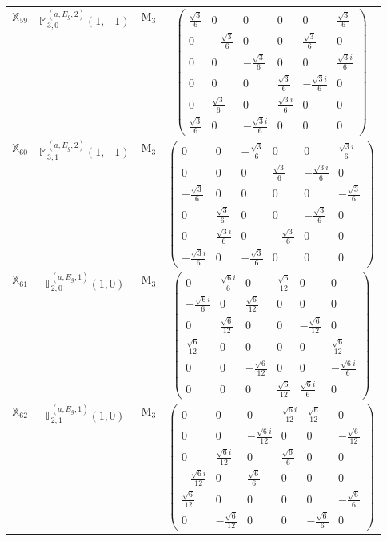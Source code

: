\documentclass[fleqn,10pt,landscape]{article}
\begin{document}
\begin{itemize}
\begin{center}
\begin{longtable}{c|c|c|c}
$ \mathbb{X}_{59} $ & $\mathbb{M}_{3,0}^{(a,E_{g},2)}(1,-1)$ & M$_{3}$ & $\begin{pmatrix} \frac{\sqrt{3}}{6} & 0 & 0 & 0 & 0 & \frac{\sqrt{3}}{6} \\ 0 & - \frac{\sqrt{3}}{6} & 0 & 0 & \frac{\sqrt{3}}{6} & 0 \\ 0 & 0 & - \frac{\sqrt{3}}{6} & 0 & 0 & \frac{\sqrt{3} i}{6} \\ 0 & 0 & 0 & \frac{\sqrt{3}}{6} & - \frac{\sqrt{3} i}{6} & 0 \\ 0 & \frac{\sqrt{3}}{6} & 0 & \frac{\sqrt{3} i}{6} & 0 & 0 \\ \frac{\sqrt{3}}{6} & 0 & - \frac{\sqrt{3} i}{6} & 0 & 0 & 0 \end{pmatrix}$ \\
$ \mathbb{X}_{60} $ & $\mathbb{M}_{3,1}^{(a,E_{g},2)}(1,-1)$ & M$_{3}$ & $\begin{pmatrix} 0 & 0 & - \frac{\sqrt{3}}{6} & 0 & 0 & \frac{\sqrt{3} i}{6} \\ 0 & 0 & 0 & \frac{\sqrt{3}}{6} & - \frac{\sqrt{3} i}{6} & 0 \\ - \frac{\sqrt{3}}{6} & 0 & 0 & 0 & 0 & - \frac{\sqrt{3}}{6} \\ 0 & \frac{\sqrt{3}}{6} & 0 & 0 & - \frac{\sqrt{3}}{6} & 0 \\ 0 & \frac{\sqrt{3} i}{6} & 0 & - \frac{\sqrt{3}}{6} & 0 & 0 \\ - \frac{\sqrt{3} i}{6} & 0 & - \frac{\sqrt{3}}{6} & 0 & 0 & 0 \end{pmatrix}$ \\
$ \mathbb{X}_{61} $ & $\mathbb{T}_{2,0}^{(a,E_{g},1)}(1,0)$ & M$_{3}$ & $\begin{pmatrix} 0 & \frac{\sqrt{6} i}{6} & 0 & \frac{\sqrt{6}}{12} & 0 & 0 \\ - \frac{\sqrt{6} i}{6} & 0 & \frac{\sqrt{6}}{12} & 0 & 0 & 0 \\ 0 & \frac{\sqrt{6}}{12} & 0 & 0 & - \frac{\sqrt{6}}{12} & 0 \\ \frac{\sqrt{6}}{12} & 0 & 0 & 0 & 0 & \frac{\sqrt{6}}{12} \\ 0 & 0 & - \frac{\sqrt{6}}{12} & 0 & 0 & - \frac{\sqrt{6} i}{6} \\ 0 & 0 & 0 & \frac{\sqrt{6}}{12} & \frac{\sqrt{6} i}{6} & 0 \end{pmatrix}$ \\
$ \mathbb{X}_{62} $ & $\mathbb{T}_{2,1}^{(a,E_{g},1)}(1,0)$ & M$_{3}$ & $\begin{pmatrix} 0 & 0 & 0 & \frac{\sqrt{6} i}{12} & \frac{\sqrt{6}}{12} & 0 \\ 0 & 0 & - \frac{\sqrt{6} i}{12} & 0 & 0 & - \frac{\sqrt{6}}{12} \\ 0 & \frac{\sqrt{6} i}{12} & 0 & \frac{\sqrt{6}}{6} & 0 & 0 \\ - \frac{\sqrt{6} i}{12} & 0 & \frac{\sqrt{6}}{6} & 0 & 0 & 0 \\ \frac{\sqrt{6}}{12} & 0 & 0 & 0 & 0 & - \frac{\sqrt{6}}{6} \\ 0 & - \frac{\sqrt{6}}{12} & 0 & 0 & - \frac{\sqrt{6}}{6} & 0 \end{pmatrix}$ \\

\end{longtable}
\end{center}
\end{itemize}
\end{document}
